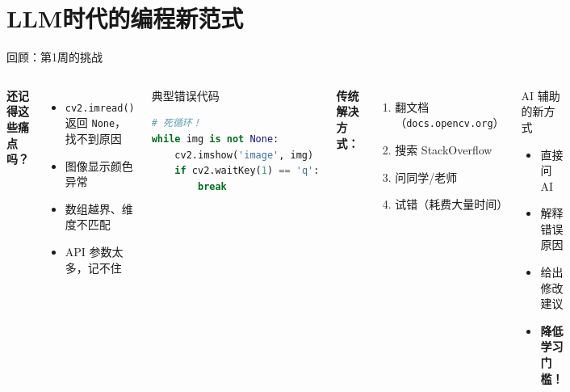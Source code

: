 
\section{LLM时代的编程新范式}


\begin{frame}[fragile]{回顾：第1周的挑战}
	\begin{columns}
		\textbf{还记得这些痛点吗？}
		\begin{itemize}
			\item \texttt{cv2.imread()} 返回 \texttt{None}，找不到原因
			\item 图像显示颜色异常
			\item 数组越界、维度不匹配
			\item API 参数太多，记不住
		\end{itemize}

		\vspace{0.3cm}

		\begin{alertblock}{典型错误代码}
			\begin{lstlisting}[language=Python, basicstyle=\ttfamily\tiny]
# 死循环！
while img is not None:
    cv2.imshow('image', img)
    if cv2.waitKey(1) == 'q':
        break
\end{lstlisting}
		\end{alertblock}

		\textbf{传统解决方式：}
		\begin{enumerate}
			\item 翻文档（\texttt{docs.opencv.org}）
			\item 搜索 StackOverflow
			\item 问同学/老师
			\item 试错（耗费大量时间）
		\end{enumerate}

		\vspace{0.3cm}

		\begin{exampleblock}{AI 辅助的新方式}
			\begin{itemize}
				\item 直接问 AI
				\item 解释错误原因
				\item 给出修改建议
				\item \textbf{降低学习门槛！}
			\end{itemize}
		\end{exampleblock}
	\end{columns}
\end{frame}

